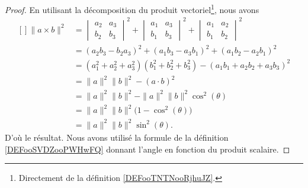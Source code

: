 \begin{proof}
	En utilisant la décomposition du produit vectoriel\footnote{Directement de la définition \ref{DEFooTNTNooRjhuJZ}.}, nous avons
	\begin{equation}
		\begin{aligned}[]
			\| a\times b \|^2 & =\begin{vmatrix}
				                     a_2 & a_3 \\
				                     b_2 & b_3
			                     \end{vmatrix}^2+\begin{vmatrix}
				                                     a_1 & a_3 \\
				                                     b_1 & b_3
			                                     \end{vmatrix}^2+\begin{vmatrix}
				                                                     a_1 & a_2 \\
				                                                     b_1 & b_2
			                                                     \end{vmatrix}^2                 \\
			                  & =(a_2b_3-b_2a_3)^2+(a_1b_3-a_3b_1)^2+(a_1b_2-a_2b_1)^2           \\
			                  & =(a_1^2+a_2^2+a_3^2)(b_1^2+b_2^2+b_3^2)-(a_1b_1+a_2b_2+a_3b_3)^2 \\
			                  & =\| a \|^2\| b \|^2-(a\cdot b)^2                                 \\
			                  & =\| a \|^2\| b \|^2-\| a \|^2\| b \|^2\cos^2(\theta)             \\
			                  & =\| a \|^2\| b \|^2\big( 1-\cos^2(\theta) \big)                  \\
			                  & =\| a \|^2\| b \|^2\sin^2(\theta).
		\end{aligned}
	\end{equation}
	D'où le résultat. Nous avons utilisé la formule de la définition \eqref{DEFooSVDZooPWHwFQ} donnant l'angle en fonction du produit scalaire.
\end{proof}

